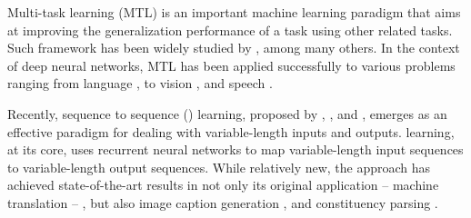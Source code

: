 Multi-task learning (MTL) is an important machine learning paradigm that
aims at improving the generalization performance of a task using other related
tasks. 
Such framework has been widely studied by
\citet{thrun96,caruana97,evgeniou04,ando05,argyriou07,kumar12}, among many
others. In the context of deep neural networks, MTL has
been applied successfully to various problems ranging from language
\citep{liu15}, to vision
\citep{donahue14},
and speech \citep{heigold13,huang2013cross}.

Recently, sequence to sequence (\ssl{}) learning, proposed by
\citet{kal13}, \citet{sutskever14}, and \citet{cho14}, emerges as an effective paradigm for dealing with
variable-length inputs and outputs. \ssl{} learning, at its core, uses
recurrent neural networks to map variable-length input sequences to
variable-length output sequences.  While relatively new, the \ssl{}
approach has achieved state-of-the-art results in not only its original
application -- machine translation --
\citep{luong15,jean15,luong15attn,jean15wmt,luong15iwslt}, but also image caption generation \citep{vinyals15caption},
and constituency parsing \citep{vinyals15grammar}. 

